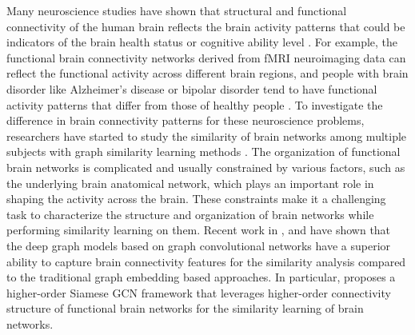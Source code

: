 \label{sec:apps_neuro}
Many neuroscience studies have shown that structural and functional connectivity of the human brain reflects the brain activity patterns that could be indicators of the brain health status or cognitive ability level . For example, the functional brain connectivity networks derived from fMRI neuroimaging data can reflect the functional activity across different brain regions, and people with brain disorder like Alzheimer's disease or bipolar disorder tend to have functional activity patterns that differ from those of healthy people . To investigate the difference in brain connectivity patterns for these neuroscience problems, researchers have started to study the similarity of brain networks among multiple subjects with graph similarity learning methods .
The organization of functional brain networks is complicated and usually constrained by various factors, such as the underlying brain anatomical network, which plays an important role in shaping the activity across the brain. These constraints make it a challenging task to characterize the structure and organization of brain networks while performing similarity learning on them. Recent work in ,  and  have shown that the deep graph models based on graph convolutional networks have a superior ability to capture brain connectivity features for the similarity analysis compared to the traditional graph embedding based approaches. In particular,  proposes a higher-order Siamese GCN framework that leverages higher-order connectivity structure of functional brain networks for the similarity learning of brain networks. 

